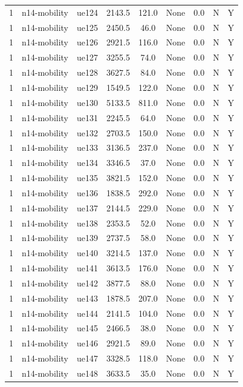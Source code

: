 \begin{table}[ht]
\begin{tabular}{|c|c|c|c|c|c|c|c|c|}
1 & n14-mobility & ue124 & 2143.5 & 121.0 & None & 0.0 & N & Y \\
1 & n14-mobility & ue125 & 2450.5 & 46.0 & None & 0.0 & N & Y \\
1 & n14-mobility & ue126 & 2921.5 & 116.0 & None & 0.0 & N & Y \\
1 & n14-mobility & ue127 & 3255.5 & 74.0 & None & 0.0 & N & Y \\
1 & n14-mobility & ue128 & 3627.5 & 84.0 & None & 0.0 & N & Y \\
1 & n14-mobility & ue129 & 1549.5 & 122.0 & None & 0.0 & N & Y \\
1 & n14-mobility & ue130 & 5133.5 & 811.0 & None & 0.0 & N & Y \\
1 & n14-mobility & ue131 & 2245.5 & 64.0 & None & 0.0 & N & Y \\
1 & n14-mobility & ue132 & 2703.5 & 150.0 & None & 0.0 & N & Y \\
1 & n14-mobility & ue133 & 3136.5 & 237.0 & None & 0.0 & N & Y \\
1 & n14-mobility & ue134 & 3346.5 & 37.0 & None & 0.0 & N & Y \\
1 & n14-mobility & ue135 & 3821.5 & 152.0 & None & 0.0 & N & Y \\
1 & n14-mobility & ue136 & 1838.5 & 292.0 & None & 0.0 & N & Y \\
1 & n14-mobility & ue137 & 2144.5 & 229.0 & None & 0.0 & N & Y \\
1 & n14-mobility & ue138 & 2353.5 & 52.0 & None & 0.0 & N & Y \\
1 & n14-mobility & ue139 & 2737.5 & 58.0 & None & 0.0 & N & Y \\
1 & n14-mobility & ue140 & 3214.5 & 137.0 & None & 0.0 & N & Y \\
1 & n14-mobility & ue141 & 3613.5 & 176.0 & None & 0.0 & N & Y \\
1 & n14-mobility & ue142 & 3877.5 & 88.0 & None & 0.0 & N & Y \\
1 & n14-mobility & ue143 & 1878.5 & 207.0 & None & 0.0 & N & Y \\
1 & n14-mobility & ue144 & 2141.5 & 104.0 & None & 0.0 & N & Y \\
1 & n14-mobility & ue145 & 2466.5 & 38.0 & None & 0.0 & N & Y \\
1 & n14-mobility & ue146 & 2921.5 & 89.0 & None & 0.0 & N & Y \\
1 & n14-mobility & ue147 & 3328.5 & 118.0 & None & 0.0 & N & Y \\
1 & n14-mobility & ue148 & 3633.5 & 35.0 & None & 0.0 & N & Y \\

\end{tabular}
\end{table}
